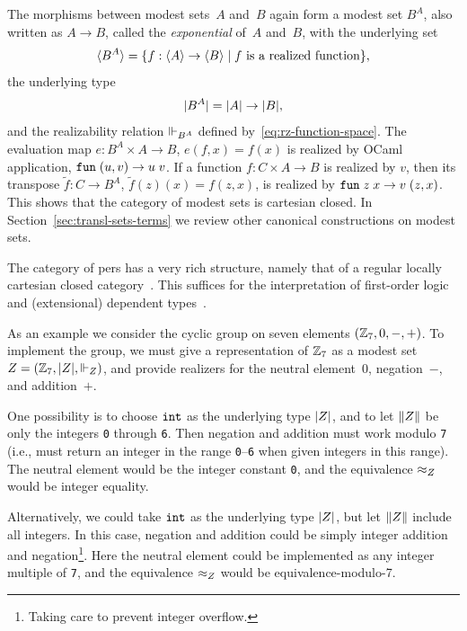 The morphisms between modest sets~$A$ and~$B$ again form a modest set
$B^A$, also written as $A \to B$, called the \emph{exponential} of~$A$
and~$B$, with the underlying set
%
\begin{equation*}
  \langle B^A \rangle =
  \{f : \langle A \rangle \to \langle B \rangle \mid \text{$f$ is a realized function}\},
\end{equation*}
%
the underlying type
%
\begin{equation*}
  |B^A| = |A| \to |B|,
\end{equation*}
%
and the realizability relation $\Vdash_{B^A}$ defined
by~\eqref{eq:rz-function-space}. The evaluation map $e : B^A \times A
\to B$, $e(f,x) = f(x)$ is realized by OCaml application,
$\mathtt{fun}\;(u,v) \to u\;v$. If a function $f : C \times A \to B$ is realized
by $v$, then its transpose $\tilde{f} : C \to B^A$, $\tilde{f}(z)(x) =
f(z,x)$, is realized by $\mathtt{fun}\;z\;x \to v \; (z,x)$. This shows that the
category of modest sets is cartesian closed. In
Section~\ref{sec:transl-sets-terms} we review other canonical
constructions on modest sets.

\bigskip
\else %
%
The category of pers has a very rich structure, namely that of a
regular locally cartesian closed category~\cite{Bauer:00}. This
suffices for the interpretation of first-order logic and (extensional)
dependent types~\cite{JacobsB:cltt}.
%
\fi %

\iflong
As an example we consider the cyclic group on seven elements $(\mathbb{Z}_7,
0, {-}, {+})$. To implement the group, we must give a representation
of $\mathbb{Z}_7$ as a modest set~$Z = (\mathbb{Z}_7, |Z|, {\Vdash_Z})$, and
provide realizers for the neutral element~$0$, negation~$-$, and
addition~$+$. 

One possibility is to choose $\mathtt{int}$ as the underlying type $|Z|$,
and to let $\|Z\|$ be only the integers \texttt{0} through \texttt{6}.
Then negation and addition must work modulo \texttt{7} (i.e., must return an integer in the
range \texttt{0}--\texttt{6} when given integers in this range).
The neutral element would be the integer constant \texttt{0}, and the
equivalence $\approx_Z$ would be integer equality.

Alternatively, we could take $\mathtt{int}$ as the underlying type
$|Z|$, but let $\|Z\|$ include all integers. In this
case, negation and addition could be simply integer addition and
negation\footnote{Taking care to prevent integer
  overflow.}. Here the neutral element could be implemented as any
integer multiple of \texttt{7}, and the equivalence $\approx_Z$ would be
equivalence-modulo-7.

